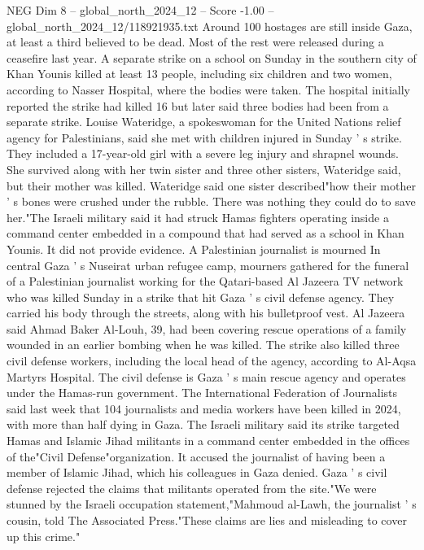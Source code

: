 \begin{textsample}{NEG Dim 8 – global\_north\_2024\_12 – Score -1.00 – global\_north\_2024\_12/118921935.txt}
Around 100 hostages are still inside Gaza, at least a third believed to be dead.
Most of the rest were released during a ceasefire last year.
A separate strike on a school on Sunday in the southern city of Khan Younis killed at least 13 people, including six children and two women, according to Nasser Hospital, where the bodies were taken.
The hospital initially reported the strike had killed 16 but later said three bodies had been from a separate strike.
Louise Wateridge, a spokeswoman for the United Nations relief agency for Palestinians, said she met with children injured in Sunday ' s strike.
They included a 17-year-old girl with a severe leg injury and shrapnel wounds.
She survived along with her twin sister and three other sisters, Wateridge said, but their mother was killed.
Wateridge said one sister described"how their mother ' s bones were crushed under the rubble.
There was nothing they could do to save her."The Israeli military said it had struck Hamas fighters operating inside a command center embedded in a compound that had served as a school in Khan Younis.
It did not provide evidence.
A Palestinian journalist is mourned In central Gaza ' s Nuseirat urban refugee camp, mourners gathered for the funeral of a Palestinian journalist working for the Qatari-based Al Jazeera TV network who was killed Sunday in a strike that hit Gaza ' s civil defense agency.
They carried his body through the streets, along with his bulletproof vest.
Al Jazeera said Ahmad Baker Al-Louh, 39, had been covering rescue operations of a family wounded in an earlier bombing when he was killed.
The strike also killed three civil defense workers, including the local head of the agency, according to Al-Aqsa Martyrs Hospital.
The civil defense is Gaza ' s main rescue agency and operates under the Hamas-run government.
The International Federation of Journalists said last week that 104 journalists and media workers have been killed in 2024, with more than half dying in Gaza.
The Israeli military said its strike targeted Hamas and Islamic Jihad militants in a command center embedded in the offices of the"Civil Defense"organization.
It accused the journalist of having been a member of Islamic Jihad, which his colleagues in Gaza denied.
Gaza ' s civil defense rejected the claims that militants operated from the site."We were stunned by the Israeli occupation statement,"Mahmoud al-Lawh, the journalist ' s cousin, told The Associated Press."These claims are lies and misleading to cover up this crime."

\end{textsample}
